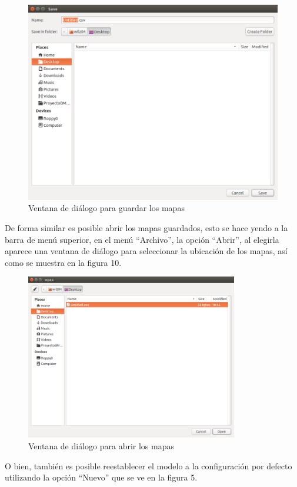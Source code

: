 \documentclass{article}
\begin{document}
	\begin{figure}[h!]
		\centering
			\includegraphics[scale=0.5, keepaspectratio=true]{report6}
				\caption{Ventana de diálogo para guardar los mapas}
	\end{figure}
	
	De forma similar es posible abrir los mapas guardados, esto se hace yendo a la barra de menú superior, en el menú ``Archivo'', la opción ``Abrir'', al elegirla aparece una ventana de diálogo para seleccionar la ubicación de los mapas, así como se muestra en la figura 10.
	
	\begin{figure}[h!]
		\centering
			\includegraphics[width=350px, keepaspectratio=false]{report7}
				\caption{Ventana de diálogo para abrir los mapas}
	\end{figure}
	
	O bien, también es posible reestablecer el modelo a la configuración por defecto utilizando la opción ``Nuevo'' que se ve en la figura 5.
	
\end{document}
